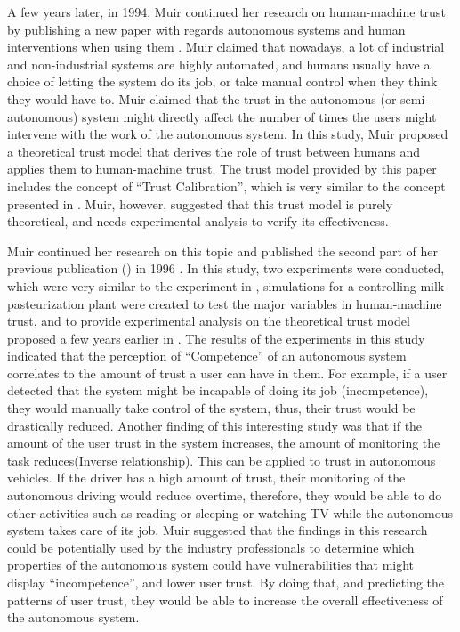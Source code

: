 \documentclass[runningheads,a4paper]{llncs}
\begin{document}
A few years later, in 1994, Muir continued her research on human-machine trust by publishing a new paper with regards autonomous systems and human interventions when using them \cite{muir1994trust}. Muir claimed that nowadays, a lot of industrial and non-industrial systems are highly automated, and humans usually have a choice of letting the system do its job, or take manual control when they think they would have to. Muir claimed that the trust in the autonomous (or semi-autonomous) system might directly affect the number of times the users might intervene with the work of the autonomous system. In this study, Muir proposed a theoretical trust model that derives the role of trust between humans and applies them to human-machine trust. The trust model provided by this paper includes the concept of ``Trust Calibration'', which is very similar to the concept presented in \cite{muir1987trust}. Muir, however, suggested that this trust model is purely theoretical, and needs experimental analysis to verify its effectiveness.

Muir continued her research on this topic and published the second part of her previous publication (\cite{muir1994trust}) in 1996 \cite{muir1996trust}. In this study, two experiments were conducted, which were very similar to the experiment in \cite{lee1992trust}, simulations for a controlling milk pasteurization plant were created to test the major variables in human-machine trust, and to provide experimental analysis on the theoretical trust model proposed a few years earlier in \cite{muir1994trust}. The results of the experiments in this study indicated that the perception of ``Competence'' of an autonomous system correlates to the amount of trust a user can have in them. For example, if a user detected that the system might be incapable of doing its job (incompetence), they would manually take control of the system, thus, their trust would be drastically reduced. Another finding of this interesting study was that if the amount of the user trust in the system increases, the amount of monitoring the task reduces(Inverse relationship). This can be applied to trust in autonomous vehicles. If the driver has a high amount of trust, their monitoring of the autonomous driving would reduce overtime, therefore, they would be able to do other activities such as reading or sleeping or watching TV while the autonomous system takes care of its job. Muir suggested that the findings in this research could be potentially used by the industry professionals to determine which properties of the autonomous system could have vulnerabilities that might display ``incompetence'', and lower user trust. By doing that, and predicting the patterns of user trust, they would be able to increase the overall effectiveness of the autonomous system.
\end{document}
